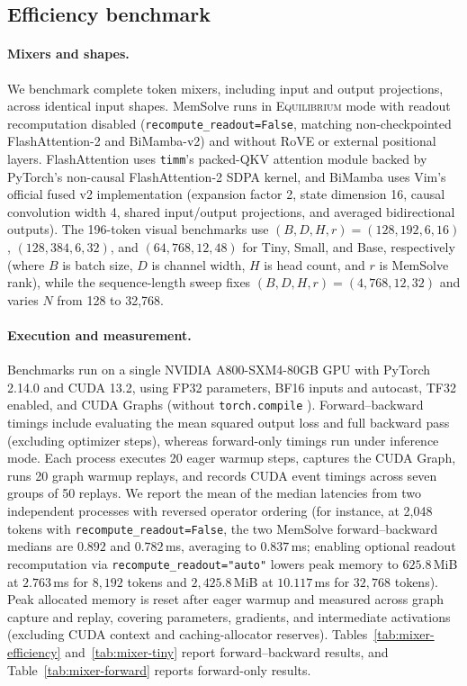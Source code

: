 \documentclass[10pt,twocolumn]{article}
\begin{document}
\subsection{Efficiency benchmark}
\label{app:efficiency}

\paragraph{Mixers and shapes.}
We benchmark complete token mixers, including input and output projections,
across identical input shapes.
MemSolve runs in \textsc{Equilibrium} mode with readout recomputation disabled
(\texttt{recompute\_readout=False}, matching non-checkpointed FlashAttention-2
and BiMamba-v2) and without RoVE or external positional layers. FlashAttention
uses \texttt{timm}'s packed-QKV attention module
backed by PyTorch's non-causal FlashAttention-2 SDPA kernel, and BiMamba uses
Vim's official fused v2 implementation (expansion factor 2, state dimension
16, causal convolution width 4, shared input/output projections, and averaged
bidirectional outputs).
The 196-token visual benchmarks use $(B,D,H,r)=(128,192,6,16)$,
$(128,384,6,32)$, and $(64,768,12,48)$ for Tiny, Small, and Base,
respectively (where $B$ is batch size, $D$ is channel width, $H$ is head
count, and $r$ is MemSolve rank), while the sequence-length sweep fixes
$(B,D,H,r)=(4,768,12,32)$ and varies $N$ from 128 to 32,768.

\paragraph{Execution and measurement.}
Benchmarks run on a single NVIDIA A800-SXM4-80GB GPU with PyTorch 2.14.0 and
CUDA 13.2, using FP32 parameters, BF16 inputs and autocast, TF32 enabled, and
CUDA Graphs (without \texttt{torch.compile} \cite{ansel2024pytorch2}).
Forward--backward timings include evaluating the mean squared output loss and
full backward pass (excluding optimizer steps), whereas forward-only timings
run under inference mode.
Each process executes 20 eager warmup steps, captures the CUDA Graph, runs 20
graph warmup replays, and records CUDA event timings across seven groups of
50 replays. We report the mean of the median latencies from two independent
processes with reversed operator ordering (for instance, at 2,048 tokens with
\texttt{recompute\_readout=False}, the two MemSolve forward--backward medians
are $0.892$ and $0.782$\,ms, averaging to $0.837$\,ms; enabling optional
readout recomputation via \texttt{recompute\_readout="auto"} lowers peak memory
to $625.8$\,MiB at $2.763$\,ms for $8{,}192$ tokens and $2{,}425.8$\,MiB at
$10.117$\,ms for $32{,}768$ tokens).
Peak allocated memory is reset after eager warmup and measured across graph
capture and replay, covering parameters, gradients, and intermediate
activations (excluding CUDA context and caching-allocator reserves).
Tables~\ref{tab:mixer-efficiency} and~\ref{tab:mixer-tiny} report
forward--backward results, and Table~\ref{tab:mixer-forward} reports
forward-only results.
\end{document}

